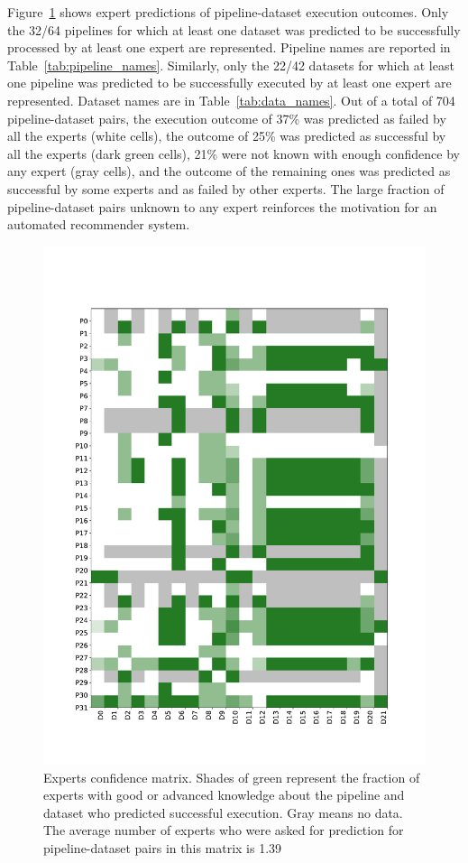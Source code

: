 \documentclass[conference]{IEEEtran}
\begin{document}
Figure~\ref{fig:experts_matrix} shows expert predictions of
pipeline-dataset execution outcomes. Only the 32/64 pipelines for which at
least one dataset was predicted to be successfully processed by at least
one expert are represented. Pipeline names are reported in
Table~\ref{tab:pipeline_names}. Similarly, only the 22/42 datasets for which
at least one pipeline was predicted to be successfully executed by at least
one expert are represented. Dataset names are in Table~\ref{tab:data_names}. Out of a total of 704 pipeline-dataset pairs,
the execution outcome of 37\% was predicted as failed by all the experts
(white cells), the outcome of 25\% was predicted as successful by all the
experts (dark green cells), 21\% were not known with enough confidence by
any expert (gray cells), and the outcome of the remaining ones was
predicted as successful by some experts and as failed by other experts. The
large fraction of pipeline-dataset pairs unknown to any expert reinforces
the motivation for an automated recommender system.
\begin{figure}
\centering
  \includegraphics[width=\columnwidth]{figures/Commented Success Percentage.pdf}
  \caption{Experts confidence matrix. Shades of green represent the fraction of experts with good or advanced knowledge about the pipeline and dataset who predicted successful execution. Gray means no data. The average number of experts who were asked for prediction for pipeline-dataset pairs in this matrix is 1.39 }
  \label{fig:experts_matrix}
\end{figure}
\end{document}
